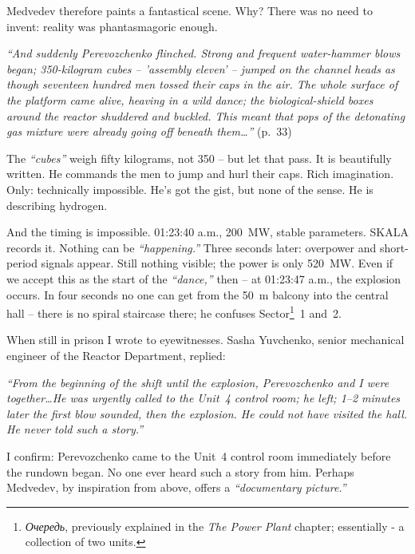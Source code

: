 \documentclass[openright]{bookest}
\begin{document}
Medvedev therefore paints a fantastical scene. Why? There was no need to invent: reality was phantasmagoric enough.

\begin{personal}
\textit{``And suddenly Perevozchenko flinched. Strong and frequent water-hammer blows began; \num{350}-kilogram cubes -- 'assembly eleven' -- jumped on the channel heads as though seventeen hundred men tossed their caps in the air. The whole surface of the platform came alive, heaving in a wild dance; the biological-shield boxes around the reactor shuddered and buckled. This meant that pops of the detonating gas mixture were already going off beneath them\ldots''} (p.~33)
\end{personal}

The \textit{``cubes''} weigh fifty kilograms, not \num{350} -- but let that pass. It is beautifully written. He commands the men to jump and hurl their caps. Rich imagination. Only: technically impossible. He's got the gist, but none of the sense. He is describing hydrogen.

And the timing is impossible. 01:23:40 a.m., \qty{200}{\mega\watt}, stable parameters. SKALA records it. Nothing can be \textit{``happening.''} Three seconds later: overpower and short-period signals appear. Still nothing visible; the power is only \qty{520}{\mega\watt}. Even if we accept this as the start of the \textit{``dance,''} then -- at 01:23:47 a.m., the explosion occurs. In four seconds no one can get from the \qty{+50}{\metre} balcony into the central hall -- there is no spiral staircase there; he confuses Sector\footnote{\textit{Очередь}, previously explained in the \textit{The Power Plant} chapter; essentially - a collection of two units.}~1 and~2.

When still in prison I wrote to eyewitnesses. Sasha Yuvchenko, senior mechanical engineer of the Reactor Department, replied:

\begin{personal}
\textit{``From the beginning of the shift until the explosion, Perevozchenko and I were together\ldots He was urgently called to the Unit~4 control room; he left; \numrange{1}{2} minutes later the first blow sounded, then the explosion. He could not have visited the hall. He never told such a story.''}
\end{personal}

I confirm: Perevozchenko came to the Unit~4 control room immediately before the rundown began. No one ever heard such a story from him. Perhaps Medvedev, by inspiration from above, offers a \textit{``documentary picture.''}
\end{document}
